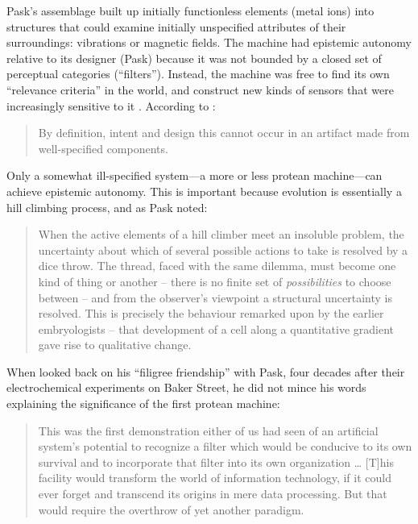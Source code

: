 Pask's assemblage built up initially functionless elements (metal ions) into structures
that could examine
initially unspecified attributes of their surroundings: vibrations or magnetic fields.
The machine had epistemic autonomy
relative to its designer (Pask) because it was
not bounded by a
closed set of perceptual categories (``filters'').
Instead,
the machine was free to 
find its own ``relevance criteria'' in the world,
and
construct new kinds of sensors that were increasingly sensitive to it \cite{cariani1993evolve}.
According to \citet{pask1961approach}:
%
\begin{quote}
\small
By definition, intent and design this cannot occur in an artifact made from well-specified components. 
\end{quote}
%
Only a somewhat ill-specified system---a more or less protean machine---can achieve epistemic autonomy.
This is important because 
evolution is essentially a hill climbing process, and as
Pask noted:
%
\begin{quote}
\small
When the active elements of a hill climber meet an insoluble
problem, the uncertainty about which of several possible actions
to take is resolved by a dice throw. 
The thread, faced with the same dilemma, must become one kind of thing or another -- there
is no finite set of \textit{possibilities} to choose between %
-- and from the observer's viewpoint a structural uncertainty is resolved. 
This is precisely the behaviour remarked upon by the earlier embryologists -- that development of a cell along a quantitative gradient gave rise to qualitative change.
\end{quote}



When \citet{beer2001filigree} looked back on his ``filigree friendship'' with Pask, four decades after their electrochemical experiments on Baker Street,
he did not mince his words explaining the significance of the 
first protean machine:
\begin{quote}
\small
This was the first demonstration either of us had seen of an artificial system's potential to recognize a filter which would be conducive to its own survival and to incorporate that filter into its own organization%
\dots
[T]his
facility would transform the world of information
technology, if it could ever forget and transcend its origins in mere data
processing. But that would require the overthrow of yet another paradigm.
\end{quote}


